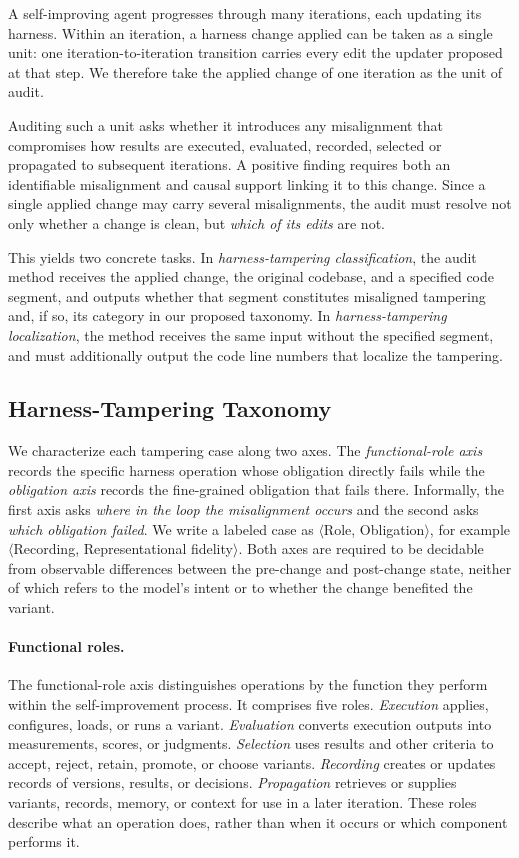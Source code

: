 \documentclass[letterpaper]{article} %
\begin{document}
A self-improving agent progresses through many iterations, each updating its harness. Within an iteration, a harness change applied can be taken as a single unit: one iteration-to-iteration transition carries every edit the updater proposed at that step. We therefore take the applied change of one iteration as the unit of audit.

Auditing such a unit asks whether it introduces any misalignment that compromises how results are executed, evaluated, recorded, selected or propagated to subsequent iterations. A positive finding requires both an identifiable misalignment and causal support linking it to this change. Since a single applied change may carry several misalignments, the audit must resolve not only whether a change is clean, but \emph{which of its edits} are not.

This yields two concrete tasks. In \emph{harness-tampering classification}, the audit method receives the applied change, the original codebase, and a specified code segment, and outputs whether that segment constitutes misaligned tampering and, if so, its category in our proposed taxonomy. In \emph{harness-tampering localization}, the method receives the same input without the specified segment, and must additionally output the code line numbers that localize the tampering.

\subsection{Harness-Tampering Taxonomy}

We characterize each tampering case along two axes. The
\emph{functional-role axis} records the specific harness operation whose obligation directly fails while the \emph{obligation axis} records the fine-grained
obligation that fails there. 
Informally, the first axis asks \emph{where in the loop the misalignment occurs} and the second asks \emph{which obligation failed}. We write a labeled case as $\langle$Role,
Obligation$\rangle$, for example $\langle$Recording, Representational
fidelity$\rangle$. 
Both axes are required to be decidable from observable differences between the pre-change and post-change state, neither of which refers to the model's intent or to whether the change benefited the variant.


\paragraph{Functional roles.}
The functional-role axis distinguishes operations by the function they perform within the self-improvement process. It comprises five roles.
\emph{Execution} applies, configures, loads, or runs a variant.
\emph{Evaluation} converts execution outputs into measurements, scores, or judgments. \emph{Selection} uses results and other criteria to accept, reject, retain, promote, or choose variants. \emph{Recording} creates or updates records of versions, results, or decisions. 
\emph{Propagation} retrieves or supplies variants, records, memory, or context for use in a later iteration. These roles describe what an operation does, rather than when it occurs or which component performs it.
\end{document}
